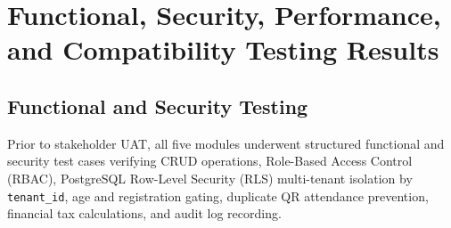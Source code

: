 \section{Functional, Security, Performance, and Compatibility Testing Results}
\label{sec:functional_security_performance_and_compatibility_testing_results}

\subsection{Functional and Security Testing}
\label{subsec:functional_and_security_testing}

\hspace*{\parindent}Prior to stakeholder UAT, all five modules underwent structured functional and security test cases verifying CRUD operations, Role-Based Access Control (RBAC), PostgreSQL Row-Level Security (RLS) multi-tenant isolation by \texttt{tenant\_id}, age and registration gating, duplicate QR attendance prevention, financial tax calculations, and audit log recording.
\vspace{5mm}

